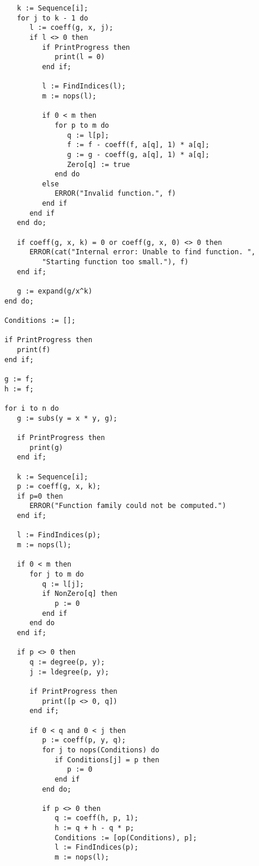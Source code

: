 \begin{verbatim}
      k := Sequence[i];
      for j to k - 1 do
         l := coeff(g, x, j);
         if l <> 0 then
            if PrintProgress then
               print(l = 0)
            end if;

            l := FindIndices(l);
            m := nops(l);

            if 0 < m then
               for p to m do
                  q := l[p];
                  f := f - coeff(f, a[q], 1) * a[q];
                  g := g - coeff(g, a[q], 1) * a[q];
                  Zero[q] := true
               end do
            else
               ERROR("Invalid function.", f)
            end if
         end if
      end do;

      if coeff(g, x, k) = 0 or coeff(g, x, 0) <> 0 then
         ERROR(cat("Internal error: Unable to find function. ",
            "Starting function too small."), f)
      end if;

      g := expand(g/x^k)
   end do;

   Conditions := [];

   if PrintProgress then
      print(f)
   end if;

   g := f;
   h := f;

   for i to n do
      g := subs(y = x * y, g);

      if PrintProgress then
         print(g)
      end if;

      k := Sequence[i];
      p := coeff(g, x, k);
      if p=0 then
         ERROR("Function family could not be computed.")
      end if;
		
      l := FindIndices(p);
      m := nops(l);

      if 0 < m then
         for j to m do
            q := l[j];
            if NonZero[q] then
               p := 0
            end if
         end do
      end if;

      if p <> 0 then
         q := degree(p, y);
         j := ldegree(p, y);

         if PrintProgress then
            print([p <> 0, q])
         end if;

         if 0 < q and 0 < j then
            p := coeff(p, y, q);
            for j to nops(Conditions) do
               if Conditions[j] = p then
                  p := 0
               end if
            end do;

            if p <> 0 then
               q := coeff(h, p, 1);
               h := q + h - q * p;
               Conditions := [op(Conditions), p];
               l := FindIndices(p);
               m := nops(l);


\end{verbatim}
